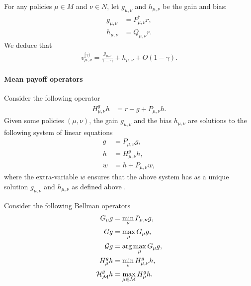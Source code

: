 \documentclass{article}
\def\G{{\cal G}}
\def\H{{\cal H}}
\def\M{{\cal M}}
\begin{document}
For any policies $\mu \in M$ and $\nu \in N$, let $g_{\mu,\nu}$ and $h_{\mu,\nu}$ be the gain and bias:
\begin{align}
  g_{\mu,\nu} &= P_{\mu,\nu}^* r,\\
  h_{\mu,\nu} &= Q_{\mu,\nu} r.
\end{align}
We deduce that
\begin{align}
  v^{[\gamma)}_{\mu,\nu} = \frac{g_{\mu,\nu}}{1-\gamma} + h_{\mu,\nu} + O(1-\gamma).
\end{align}

\paragraph{Mean payoff operators}

Consider the following operator
\begin{align}
  H^{g}_{\mu,\nu} h & = r-g + P_{\mu,\nu}h.
\end{align}
Given some policies $(\mu,\nu)$, the gain $g_{\mu,\nu}$ and the bias $h_{\mu,\nu}$ are solutions to the following system of linear equations
\begin{align}
  g &= P_{\mu,\nu} g, \\
  h &= H^{g}_{\mu,\nu} h, \\
  w &= h + P_{\mu,\nu} w,
\end{align}
where the extra-variable $w$ ensures that the above system has as a unique solution $g_{\mu,\nu}$ and $h_{\mu,\nu}$ as defined above \cite[Theorem 8.2.6 and Corollary 8.2.9]{puterman}.

Consider the following Bellman operators
\begin{align}
G_{\mu} g & = \min_\nu P_{\mu,\nu} g,  \\
G g &= \max_\mu G_{\mu} g, \\
\G g & = \arg\max_\mu G_{\mu} g, \\
H^{g}_\mu h & = \min_\nu H^{g}_{\mu,\nu} h, \\
\H^g_{\M} h & = \max_{\mu \in \M} H^g_\mu h.
\end{align}
\end{document}

